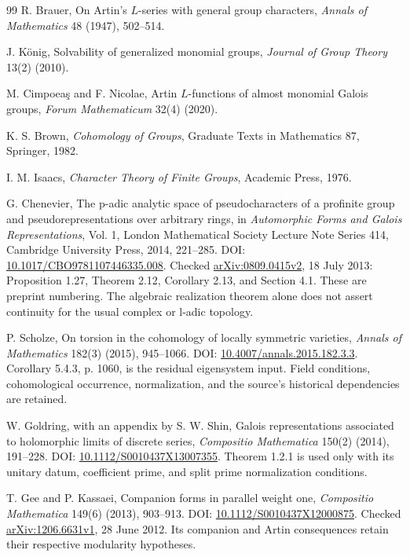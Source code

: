 \begin{thebibliography}{99}
R. Brauer, On Artin's \(L\)-series with general group characters, \emph{Annals of Mathematics} 48 (1947), 502--514.

J. K\"onig, Solvability of generalized monomial groups, \emph{Journal of Group Theory} 13(2) (2010).

M. Cimpoea\c{s} and F. Nicolae, Artin \(L\)-functions of almost monomial Galois groups, \emph{Forum Mathematicum} 32(4) (2020).

K. S. Brown, \emph{Cohomology of Groups}, Graduate Texts in Mathematics 87, Springer, 1982.

I. M. Isaacs, \emph{Character Theory of Finite Groups}, Academic Press, 1976.

G. Chenevier, The p-adic analytic space of pseudocharacters of a profinite group and pseudorepresentations over arbitrary rings, in \emph{Automorphic Forms and Galois Representations}, Vol. 1, London Mathematical Society Lecture Note Series 414, Cambridge University Press, 2014, 221--285. DOI: \href{https://doi.org/10.1017/CBO9781107446335.008}{10.1017/CBO9781107446335.008}. Checked \href{https://arxiv.org/abs/0809.0415}{arXiv:0809.0415v2}, 18 July 2013: Proposition 1.27, Theorem 2.12, Corollary 2.13, and Section 4.1. These are preprint numbering. The algebraic realization theorem alone does not assert continuity for the usual complex or l-adic topology.

P. Scholze, On torsion in the cohomology of locally symmetric varieties, \emph{Annals of Mathematics} 182(3) (2015), 945--1066. DOI: \href{https://doi.org/10.4007/annals.2015.182.3.3}{10.4007/annals.2015.182.3.3}. Corollary 5.4.3, p. 1060, is the residual eigensystem input. Field conditions, cohomological occurrence, normalization, and the source's historical dependencies are retained.

W. Goldring, with an appendix by S. W. Shin, Galois representations associated to holomorphic limits of discrete series, \emph{Compositio Mathematica} 150(2) (2014), 191--228. DOI: \href{https://doi.org/10.1112/S0010437X13007355}{10.1112/S0010437X13007355}. Theorem 1.2.1 is used only with its unitary datum, coefficient prime, and split prime normalization conditions.

T. Gee and P. Kassaei, Companion forms in parallel weight one, \emph{Compositio Mathematica} 149(6) (2013), 903--913. DOI: \href{https://doi.org/10.1112/S0010437X12000875}{10.1112/S0010437X12000875}. Checked \href{https://arxiv.org/abs/1206.6631}{arXiv:1206.6631v1}, 28 June 2012. Its companion and Artin consequences retain their respective modularity hypotheses.


\end{thebibliography}
